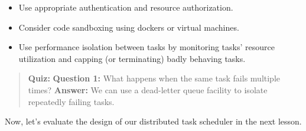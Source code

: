 \begin{itemize}
\item
\protect{}\label{8QNzrovJ-VjArhcF4pvPB}
Use appropriate authentication and resource authorization.
\item
\protect{}\label{7s15UcUWmo1iai0NAZZpl}
Consider code sandboxing using dockers or virtual machines.
\item
\protect{}\label{Bk8oCDEBauFkgueH0NT5V}
Use performance isolation between tasks by monitoring tasks' resource utilization and capping (or terminating) badly behaving tasks.
\end{itemize}

\begin{quote}
\textbf{Quiz:}
\textbf{Question 1:} What happens when the same task fails multiple times?
\textbf{Answer:} We can use a dead-letter queue facility to isolate repeatedly failing tasks.
\end{quote}

Now, let's evaluate the design of our distributed task scheduler in the next lesson.

